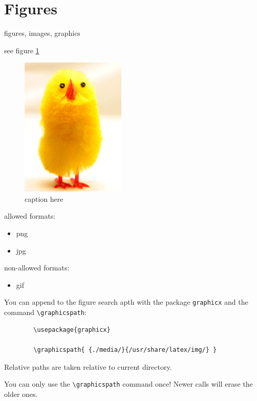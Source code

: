 \documentclass[12pt]{article}
\begin{document}
\section{Figures}\label{secTab}

    figures, images, graphics

    see figure \ref{fig-label}

    \begin{figure}[htb]
        \centering
        \includegraphics[width=5cm]{image.png}
        \caption{caption here}
        \label{fig-label}
    \end{figure}

    allowed formats:

    \begin{itemize}
        \item png
        \item jpg
    \end{itemize}

    non-allowed formats:

    \begin{itemize}
        \item gif
    \end{itemize}

    You can append to the figure search apth with the package \lstinline|graphicx| and the command \lstinline|\graphicspath|:

    \begin{lstlisting}
        \usepackage{graphicx}

        \graphicspath{ {./media/}{/usr/share/latex/img/} }
    \end{lstlisting}

    Relative paths are taken relative to current directory.

    You can only use the \lstinline|\graphicspath| command once! Newer calls will erase the older ones.
\end{document}
